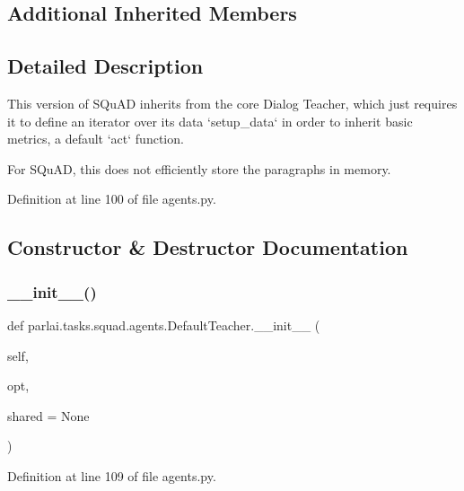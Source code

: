 \subsection*{Additional Inherited Members}


\subsection{Detailed Description}
\begin{DoxyVerb}This version of SQuAD inherits from the core Dialog Teacher, which just requires it
to define an iterator over its data `setup_data` in order to inherit basic metrics,
a default `act` function.

For SQuAD, this does not efficiently store the paragraphs in memory.
\end{DoxyVerb}
 

Definition at line 100 of file agents.\+py.



\subsection{Constructor \& Destructor Documentation}
\mbox{\label{classparlai_1_1tasks_1_1squad_1_1agents_1_1DefaultTeacher_a22833504fb2903d282c7415396bfb3dd}} 
\subsubsection{\texorpdfstring{\+\_\+\+\_\+init\+\_\+\+\_\+()}{\_\_init\_\_()}}
{\footnotesize\ttfamily def parlai.\+tasks.\+squad.\+agents.\+Default\+Teacher.\+\_\+\+\_\+init\+\_\+\+\_\+ (\begin{DoxyParamCaption}\item[{}]{self,  }\item[{}]{opt,  }\item[{}]{shared = {\ttfamily None} }\end{DoxyParamCaption})}



Definition at line 109 of file agents.\+py.


